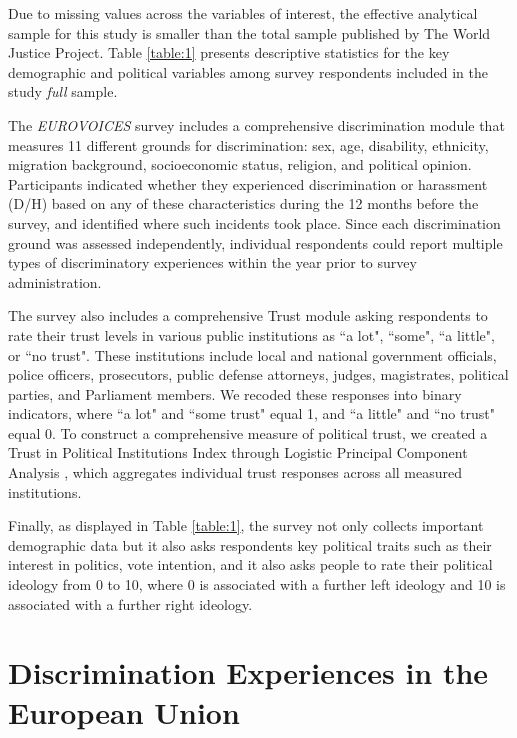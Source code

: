 \documentclass{article}
\begin{document}
Due to missing values across the variables of interest, the effective analytical sample for this study is smaller than the total sample published by The World Justice Project. Table \ref{table:1} presents descriptive statistics for the key demographic and political variables among survey respondents included in the study \emph{full} sample.



The \emph{EUROVOICES} survey includes a comprehensive discrimination module that measures 11 different grounds for discrimination: sex, age, disability, ethnicity, migration background, socioeconomic status, religion, and political opinion. Participants indicated whether they experienced discrimination or harassment (D/H) based on any of these characteristics during the 12 months before the survey, and identified where such incidents took place. Since each discrimination ground was assessed independently, individual respondents could report multiple types of discriminatory experiences within the year prior to survey administration.

The survey also includes a comprehensive Trust module asking respondents to rate their trust levels in various public institutions as ``a lot", ``some", ``a little", or ``no trust". These institutions include local and national government officials, police officers, prosecutors, public defense attorneys, judges, magistrates, political parties, and Parliament members. We recoded these responses into binary indicators, where ``a lot" and ``some trust" equal 1, and ``a little" and ``no trust" equal 0. To construct a comprehensive measure of political trust, we created a Trust in Political Institutions Index through Logistic Principal Component Analysis \parencite{landgraf_dimensionality_2020}, which aggregates individual trust responses across all measured institutions.

Finally, as displayed in Table \ref{table:1}, the survey not only collects important demographic data but it also asks respondents key political traits such as their interest in politics, vote intention, and it also asks people to rate their political ideology from 0 to 10, where 0 is associated with a further left ideology and 10 is associated with a further right ideology.

\section{Discrimination Experiences in the European Union}
\end{document}
